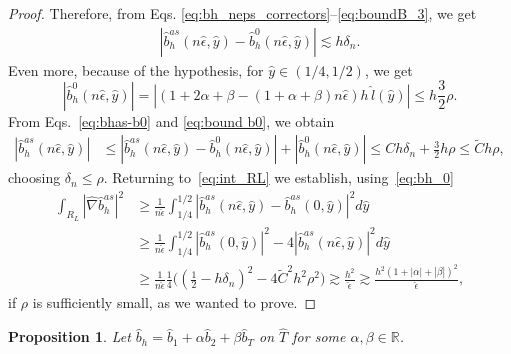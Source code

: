 \documentclass{article}
\newcommand{\est}{\text{\,e.s.t.}\xspace}
\newtheorem{propo}[thm]{Proposition}
\newcommand{\rz}{\mathbb{R}}
\newcommand{\oab}{\ensuremath{1+\alpha+\beta}}
\newcommand{\otab}{\ensuremath{1+2\alpha+\beta}}
\newcommand{\hatT}{\ensuremath{{\hat{T}}}}
\newcommand{\hatb}{\ensuremath{\hat{b}}}
\newcommand{\haty}{\ensuremath{{\hat{y}}}}
\newcommand{\hatN}{\ensuremath{\hat{\nabla}}}
\newcommand{\hatnep}{\ensuremath{n\hat{\epsilon}}}
\begin{document}
\begin{appendix}
\begin{proof}
Therefore, from Eqs. \eqref{eq:bh_neps_correctors}--\eqref{eq:boundB_3}, we get
\begin{equation}\label{eq:bhas-b0}
\begin{aligned}
|\hatb_h^{as}(n\hat{\epsilon},\haty)-\hatb_h^0(n\hat{\epsilon},\haty)|
\lesssim h\delta_n.
\end{aligned}
\end{equation}
Even more, because of the hypothesis, for $\haty\in(1/4,1/2)$, we get
\begin{equation}
\label{eq:bound b0}
|\hatb_h^0(n\hat{\epsilon},\haty)| = 
    |(\otab -(\oab)n\hat{\epsilon})h\,\hat l(\haty)|\leq h\frac32\rho .
\end{equation}
From Eqs.~\eqref{eq:bhas-b0} and \eqref{eq:bound b0}, we obtain
\begin{equation*}
\begin{aligned} 
|\hatb_h^{as}(\hatnep,\haty)|&
\leq |\hatb_h^{as}(\hatnep,\haty)-\hatb_h^0(n\hat{\epsilon},\haty)|
+ |\hatb_h^0(n\hat{\epsilon},\haty)|
\leq Ch\delta_n + \frac32h\rho
\le \tilde Ch \rho,
\end{aligned}
\end{equation*}
choosing $\delta_n \le \rho$.
Returning to~\eqref{eq:int_RL} we establish,
using~\eqref{eq:bh_0}
\begin{equation*}
    \begin{aligned}
    \int_{R_L}|\hatN \hatb_h^{as}|^2
    &\geq \frac{1}{n\hat{\epsilon}}\int_{1/4}^{1/2}|\hatb_h^{as}(n\hat{\epsilon},\haty) - \hatb_h^{as}(0,\haty)|^2 d\haty\\
    &\geq \frac{1}{n\hat{\epsilon}}\int_{1/4}^{1/2}|\hatb_h^{as}(0,\haty)|^2 - 4|\hatb_h^{as}(\hatnep,\haty)|^2 d\haty\\
    &\geq \frac{1}{n\hat{\epsilon}}\frac{1}{4}\Big((\frac{1}{2}-h\delta_n)^2 - 4\tilde{C}^2h^2\rho^2\Big)\gtrsim \frac{h^2}{\hat{\epsilon}}
    \gtrsim \frac{h^2(1+|\alpha|+|\beta|)^2}{\hat{\epsilon}}
    ,
    \end{aligned}
\end{equation*}
if $\rho$ is sufficiently small,
as we wanted to prove.
\end{proof}
\begin{propo}\label{prop:bubble_bound_inf}
Let $\hatb_h= \hatb_1 + \alpha \hatb_2 + \beta \hatb_T$ on $\hatT$ for some $\alpha,\beta\in \rz$.

\end{propo}
\end{appendix}
\end{document}
